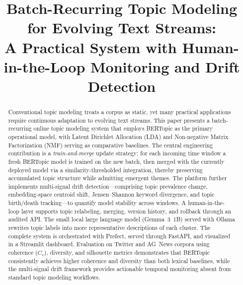 \documentclass[conference]{IEEEtran}
\newcommand{\bertopic}{BERTopic\xspace}
\newcommand{\lda}{LDA\xspace}
\newcommand{\nmf}{NMF\xspace}
\begin{document}
\title{Batch-Recurring Topic Modeling for Evolving Text Streams:\\
A Practical System with Human-in-the-Loop Monitoring and Drift Detection}

\author{%
\and
{}
}

\maketitle

\begin{abstract}
Conventional topic modeling treats a corpus as static, yet many practical applications require continuous adaptation to evolving text streams. This paper presents a batch-recurring online topic modeling system that employs \bertopic as the primary operational model, with Latent Dirichlet Allocation (\lda) and Non-negative Matrix Factorization (\nmf) serving as comparative baselines. The central engineering contribution is a \emph{train-and-merge} update strategy: for each incoming time window a fresh \bertopic model is trained on the new batch, then merged with the currently deployed model via a similarity-thresholded integration, thereby preserving accumulated topic structure while admitting emergent themes. The platform further implements multi-signal drift detection---comprising topic prevalence change, embedding-space centroid shift, Jensen--Shannon keyword divergence, and topic birth/death tracking---to quantify model stability across windows. A human-in-the-loop layer supports topic relabeling, merging, version history, and rollback through an audited API. The small local large language model (Gemma~3~1B) served with Ollama rewrites topic labels into more representative descriptions of each cluster. The complete system is orchestrated with Prefect, served through FastAPI, and visualized in a Streamlit dashboard. Evaluation on Twitter and AG~News corpora using coherence ($C_v$), diversity, and silhouette metrics demonstrates that \bertopic consistently achieves higher coherence and diversity than both lexical baselines, while the multi-signal drift framework provides actionable temporal monitoring absent from standard topic modeling workflows.
\end{abstract}
\end{document}
